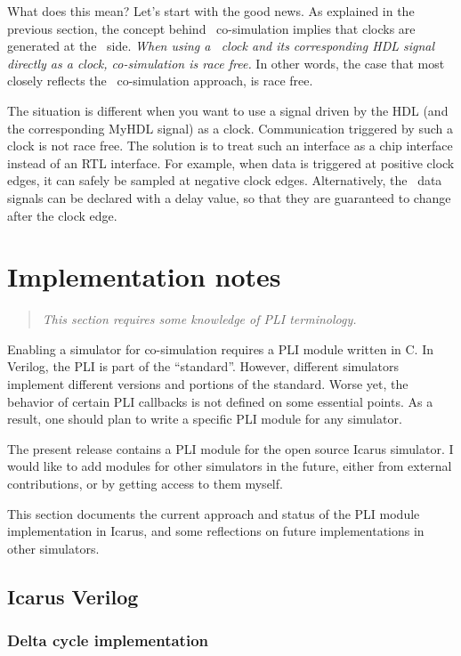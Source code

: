 What does this mean? Let's start with the good news. As explained in
the previous section, the concept behind \myhdl\ co-simulation implies
that clocks are generated at the \myhdl\ side.  \emph{When using a
\myhdl\ clock and its corresponding HDL signal directly as a clock,
co-simulation is race free.} In other words, the case
that most closely reflects the \myhdl\ co-simulation approach, is race free.

The situation is different when you want to use a signal driven by the
HDL (and the corresponding MyHDL signal) as a clock. 
Communication triggered by such a clock is not race free. The solution
is to treat such an interface as a chip interface instead of an RTL
interface.  For example, when data is triggered at positive clock
edges, it can safely be sampled at negative clock edges.
Alternatively, the \myhdl\ data signals can be declared with a delay
value, so that they are guaranteed to change after the clock
edge.


\section{Implementation notes}

\begin{quote}
\em
This section requires some knowledge of PLI terminology.
\end{quote}

Enabling a simulator for co-simulation requires a PLI module written
in C. In Verilog, the PLI is part of the ``standard''.  However,
different simulators implement different versions and portions of the
standard. Worse yet, the behavior of certain PLI callbacks is not
defined on some essential points.  As a result, one should plan to
write a specific PLI module for any simulator.

The present release contains a PLI module for the open source Icarus
simulator. I would like to add modules for other simulators in the
future, either from external contributions, or by getting access to
them myself.

This section documents the current approach and status of the PLI
module implementation in Icarus, and some reflections on future
implementations in other simulators.

\subsection{Icarus Verilog}

\subsubsection{Delta cycle implementation}
\label{icarus-delta-cycles}

